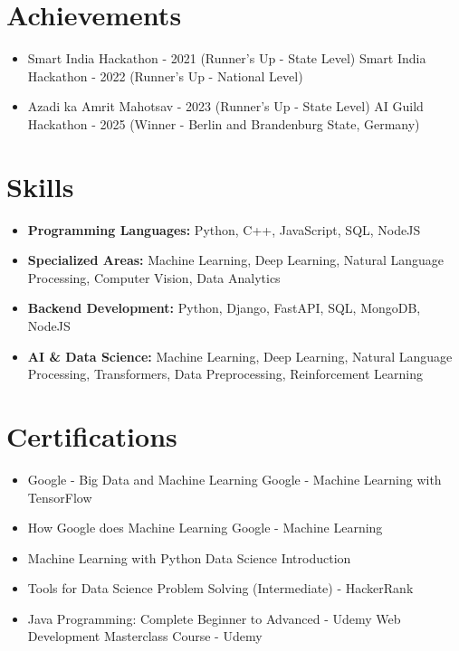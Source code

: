 \documentclass[a4paper,10pt]{article}
\begin{document}
\section*{Achievements}
\begin{itemize}
\item Smart India Hackathon - 2021 (Runner's Up - State Level) \hfill Smart India Hackathon - 2022 (Runner's Up - National Level)
\item Azadi ka Amrit Mahotsav - 2023 (Runner's Up - State Level) \hfill AI Guild Hackathon - 2025 (Winner - Berlin and Brandenburg State, Germany)
\end{itemize}

\section*{Skills}
\begin{itemize}
  \item \textbf{Programming Languages:} Python, C++, JavaScript, SQL, NodeJS
  \item \textbf{Specialized Areas:} Machine Learning, Deep Learning, Natural Language Processing, Computer Vision, Data Analytics
  \item \textbf{Backend Development:} Python, Django, FastAPI, SQL, MongoDB, NodeJS
  \item \textbf{AI \& Data Science:} Machine Learning, Deep Learning, Natural Language Processing, Transformers, Data Preprocessing, Reinforcement Learning
\end{itemize}

\section*{Certifications}
\begin{itemize}
\item Google - Big Data and Machine Learning \hfill Google - Machine Learning with TensorFlow
\item How Google does Machine Learning \hfill Google - Machine Learning
\item Machine Learning with Python \hfill Data Science Introduction
\item Tools for Data Science \hfill Problem Solving (Intermediate) - HackerRank
\item Java Programming: Complete Beginner to Advanced - Udemy \hfill Web Development Masterclass Course - Udemy
\end{itemize}
\end{document}
